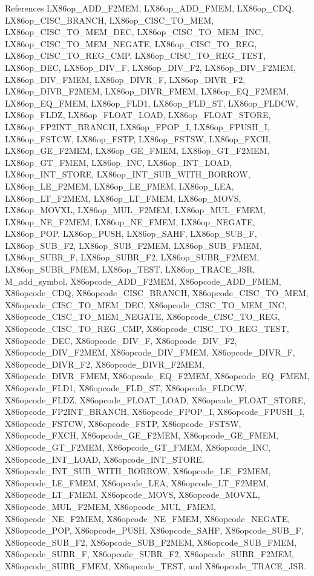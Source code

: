 References LX86op\_\-ADD\_\-F2MEM, LX86op\_\-ADD\_\-FMEM, LX86op\_\-CDQ, LX86op\_\-CISC\_\-BRANCH, LX86op\_\-CISC\_\-TO\_\-MEM, LX86op\_\-CISC\_\-TO\_\-MEM\_\-DEC, LX86op\_\-CISC\_\-TO\_\-MEM\_\-INC, LX86op\_\-CISC\_\-TO\_\-MEM\_\-NEGATE, LX86op\_\-CISC\_\-TO\_\-REG, LX86op\_\-CISC\_\-TO\_\-REG\_\-CMP, LX86op\_\-CISC\_\-TO\_\-REG\_\-TEST, LX86op\_\-DEC, LX86op\_\-DIV\_\-F, LX86op\_\-DIV\_\-F2, LX86op\_\-DIV\_\-F2MEM, LX86op\_\-DIV\_\-FMEM, LX86op\_\-DIVR\_\-F, LX86op\_\-DIVR\_\-F2, LX86op\_\-DIVR\_\-F2MEM, LX86op\_\-DIVR\_\-FMEM, LX86op\_\-EQ\_\-F2MEM, LX86op\_\-EQ\_\-FMEM, LX86op\_\-FLD1, LX86op\_\-FLD\_\-ST, LX86op\_\-FLDCW, LX86op\_\-FLDZ, LX86op\_\-FLOAT\_\-LOAD, LX86op\_\-FLOAT\_\-STORE, LX86op\_\-FP2INT\_\-BRANCH, LX86op\_\-FPOP\_\-I, LX86op\_\-FPUSH\_\-I, LX86op\_\-FSTCW, LX86op\_\-FSTP, LX86op\_\-FSTSW, LX86op\_\-FXCH, LX86op\_\-GE\_\-F2MEM, LX86op\_\-GE\_\-FMEM, LX86op\_\-GT\_\-F2MEM, LX86op\_\-GT\_\-FMEM, LX86op\_\-INC, LX86op\_\-INT\_\-LOAD, LX86op\_\-INT\_\-STORE, LX86op\_\-INT\_\-SUB\_\-WITH\_\-BORROW, LX86op\_\-LE\_\-F2MEM, LX86op\_\-LE\_\-FMEM, LX86op\_\-LEA, LX86op\_\-LT\_\-F2MEM, LX86op\_\-LT\_\-FMEM, LX86op\_\-MOVS, LX86op\_\-MOVXL, LX86op\_\-MUL\_\-F2MEM, LX86op\_\-MUL\_\-FMEM, LX86op\_\-NE\_\-F2MEM, LX86op\_\-NE\_\-FMEM, LX86op\_\-NEGATE, LX86op\_\-POP, LX86op\_\-PUSH, LX86op\_\-SAHF, LX86op\_\-SUB\_\-F, LX86op\_\-SUB\_\-F2, LX86op\_\-SUB\_\-F2MEM, LX86op\_\-SUB\_\-FMEM, LX86op\_\-SUBR\_\-F, LX86op\_\-SUBR\_\-F2, LX86op\_\-SUBR\_\-F2MEM, LX86op\_\-SUBR\_\-FMEM, LX86op\_\-TEST, LX86op\_\-TRACE\_\-JSR, M\_\-add\_\-symbol, X86opcode\_\-ADD\_\-F2MEM, X86opcode\_\-ADD\_\-FMEM, X86opcode\_\-CDQ, X86opcode\_\-CISC\_\-BRANCH, X86opcode\_\-CISC\_\-TO\_\-MEM, X86opcode\_\-CISC\_\-TO\_\-MEM\_\-DEC, X86opcode\_\-CISC\_\-TO\_\-MEM\_\-INC, X86opcode\_\-CISC\_\-TO\_\-MEM\_\-NEGATE, X86opcode\_\-CISC\_\-TO\_\-REG, X86opcode\_\-CISC\_\-TO\_\-REG\_\-CMP, X86opcode\_\-CISC\_\-TO\_\-REG\_\-TEST, X86opcode\_\-DEC, X86opcode\_\-DIV\_\-F, X86opcode\_\-DIV\_\-F2, X86opcode\_\-DIV\_\-F2MEM, X86opcode\_\-DIV\_\-FMEM, X86opcode\_\-DIVR\_\-F, X86opcode\_\-DIVR\_\-F2, X86opcode\_\-DIVR\_\-F2MEM, X86opcode\_\-DIVR\_\-FMEM, X86opcode\_\-EQ\_\-F2MEM, X86opcode\_\-EQ\_\-FMEM, X86opcode\_\-FLD1, X86opcode\_\-FLD\_\-ST, X86opcode\_\-FLDCW, X86opcode\_\-FLDZ, X86opcode\_\-FLOAT\_\-LOAD, X86opcode\_\-FLOAT\_\-STORE, X86opcode\_\-FP2INT\_\-BRANCH, X86opcode\_\-FPOP\_\-I, X86opcode\_\-FPUSH\_\-I, X86opcode\_\-FSTCW, X86opcode\_\-FSTP, X86opcode\_\-FSTSW, X86opcode\_\-FXCH, X86opcode\_\-GE\_\-F2MEM, X86opcode\_\-GE\_\-FMEM, X86opcode\_\-GT\_\-F2MEM, X86opcode\_\-GT\_\-FMEM, X86opcode\_\-INC, X86opcode\_\-INT\_\-LOAD, X86opcode\_\-INT\_\-STORE, X86opcode\_\-INT\_\-SUB\_\-WITH\_\-BORROW, X86opcode\_\-LE\_\-F2MEM, X86opcode\_\-LE\_\-FMEM, X86opcode\_\-LEA, X86opcode\_\-LT\_\-F2MEM, X86opcode\_\-LT\_\-FMEM, X86opcode\_\-MOVS, X86opcode\_\-MOVXL, X86opcode\_\-MUL\_\-F2MEM, X86opcode\_\-MUL\_\-FMEM, X86opcode\_\-NE\_\-F2MEM, X86opcode\_\-NE\_\-FMEM, X86opcode\_\-NEGATE, X86opcode\_\-POP, X86opcode\_\-PUSH, X86opcode\_\-SAHF, X86opcode\_\-SUB\_\-F, X86opcode\_\-SUB\_\-F2, X86opcode\_\-SUB\_\-F2MEM, X86opcode\_\-SUB\_\-FMEM, X86opcode\_\-SUBR\_\-F, X86opcode\_\-SUBR\_\-F2, X86opcode\_\-SUBR\_\-F2MEM, X86opcode\_\-SUBR\_\-FMEM, X86opcode\_\-TEST, and X86opcode\_\-TRACE\_\-JSR.

